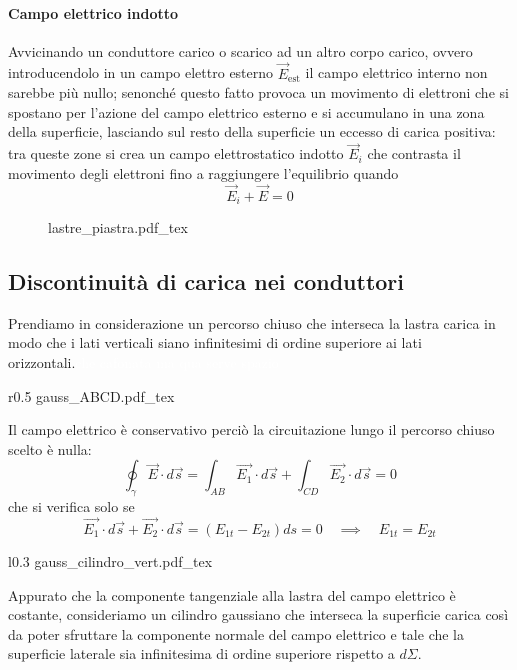 \documentclass[x11names]{report}
\newcommand{\incfig}[1]{%
	{#1.pdf_tex}
}
\begin{document}
\paragraph*{Campo elettrico indotto}
Avvicinando un conduttore carico o scarico ad un altro corpo carico, ovvero introducendolo in un campo elettro esterno \(\vec{E}_\text{est}\) il campo elettrico interno non sarebbe più nullo; senonché questo fatto provoca un movimento di elettroni che si spostano per l'azione del campo elettrico esterno e si accumulano in una zona della superficie, lasciando sul resto della superficie un eccesso di carica positiva: tra queste zone si crea un campo elettrostatico indotto \(\vec{E}_i\) che contrasta il movimento degli elettroni fino a raggiungere l'equilibrio quando
\[
\vec{E}_i + \vec{E} = 0
	\]
\begin{figure}[H]
	\centering
	\incfig{lastre_piastra}
\end{figure}

\subsection{Discontinuità di carica nei conduttori}
Prendiamo in considerazione un percorso chiuso che interseca la lastra carica in modo che i lati verticali siano infinitesimi di ordine superiore ai lati orizzontali.\textcolor{white}{che cafonata ma qua serve spazio}
\begin{wrapfigure}{r}{0.5\textwidth}
	\hspace{1cm}
	\incfig{gauss_ABCD}
\end{wrapfigure}

Il campo elettrico è conservativo perciò la circuitazione lungo il percorso chiuso scelto è nulla:
\[
\oint_\gamma \vec{E}\cdot d\vec{s} = \int_{AB} \vec{E_1}\cdot d\vec{s} + \int_{CD}  \vec{E_2}\cdot  d\vec{s} = 0
\]
che si verifica solo se
\[
\vec{E_1}\cdot  d\vec{s} + \vec{E_2}\cdot  d\vec{s} =( E_{1t}  - E_{2t})ds = 0 \quad \implies \quad  E_{1t} = E_{2t}
\]
\begin{wrapfigure}{l}{0.3\textwidth}
	\incfig{gauss_cilindro_vert}
\end{wrapfigure}
Appurato che la componente tangenziale alla lastra del campo elettrico è costante, consideriamo un cilindro gaussiano che interseca la superficie carica così da poter sfruttare la componente normale del campo elettrico e tale che la superficie laterale sia infinitesima di ordine superiore rispetto a \(d\Sigma\). \\
\end{document}

